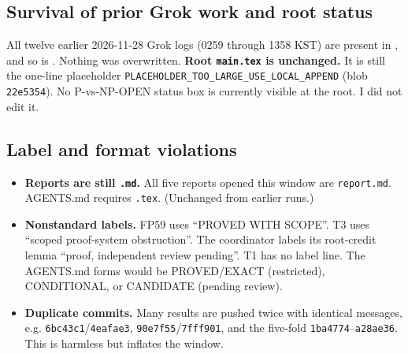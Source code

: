 \documentclass[11pt]{article}
\theoremstyle{definition}
\theoremstyle{remark}
\begin{document}
\subsection{Survival of prior Grok work and root status}
All twelve earlier 2026-11-28 Grok logs (0259 through 1358 KST) are present in
, and so is . Nothing was overwritten.
\textbf{Root \texttt{main.tex} is unchanged.} It is still the one-line placeholder
\texttt{PLACEHOLDER\_TOO\_LARGE\_USE\_LOCAL\_APPEND} (blob \texttt{22e5354}). No
P-vs-NP-OPEN status box is currently visible at the root. I did not edit it.

\subsection{Label and format violations}
\begin{itemize}
\item \textbf{Reports are still \texttt{.md}.} All five reports opened this window are
\texttt{report.md}. AGENTS.md requires \texttt{.tex}. (Unchanged from earlier runs.)
\item \textbf{Nonstandard labels.} FP59 uses ``PROVED WITH SCOPE''. T3 uses ``scoped
proof-system obstruction''. The coordinator labels its root-credit lemma ``proof, independent
review pending''. T1 has no label line. The AGENTS.md forms would be PROVED/EXACT (restricted),
CONDITIONAL, or CANDIDATE (pending review).
\item \textbf{Duplicate commits.} Many results are pushed twice with identical messages, e.g.
\texttt{6bc43c1}/\texttt{4eafae3}, \texttt{90e7f55}/\texttt{7fff901}, and the five-fold
\texttt{1ba4774}--\texttt{a28ae36}. This is harmless but inflates the window.
\end{itemize}
\end{document}
